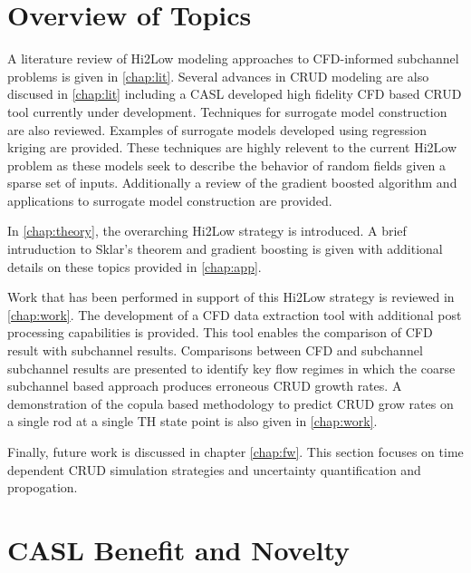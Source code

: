 

\section{Overview of Topics}

A literature review of Hi2Low modeling approaches to CFD-informed subchannel
problems is given in \autoref{chap:lit}.  Several advances in CRUD modeling are
also discused in \autoref{chap:lit} including a CASL developed high fidelity
CFD based CRUD tool currently under development.
Techniques for surrogate model construction are also reviewed.  Examples of
surrogate models developed using regression kriging are provided.  These
techniques are highly relevent to the current Hi2Low problem as these models
seek to describe the behavior of random fields given a sparse set of inputs.
Additionally a review
of the gradient boosted algorithm and applications to surrogate model construction
are provided.

In \autoref{chap:theory}, the overarching Hi2Low strategy is introduced.  A brief
intruduction to Sklar's theorem and gradient boosting is given with additional details
on these topics provided in \autoref{chap:app}.

Work that has been performed in support of this Hi2Low strategy is reviewed in
\autoref{chap:work}.  The development of a CFD data extraction tool with
additional post processing capabilities is provided.  This tool enables the
comparison of CFD result with subchannel results.  Comparisons between CFD and subchannel
subchannel results are presented to identify key flow regimes in which the
coarse subchannel based approach produces erroneous CRUD growth rates.
A demonstration of the copula based methodology to predict CRUD grow rates on a
single rod at a single TH state point is also given in
\autoref{chap:work}.

Finally, future work is discussed in chapter \autoref{chap:fw}.  This section focuses on
time dependent CRUD simulation strategies and uncertainty quantification and propogation.

\section{CASL Benefit and Novelty}

